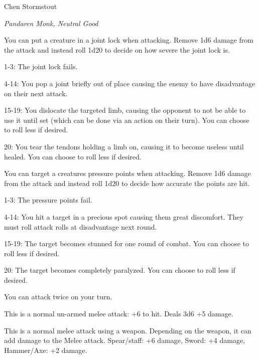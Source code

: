 \begin{monsterbox}{Chen Stormstout}
	\begin{hangingpar}
		\textit{Pandaren Monk, Neutral Good}
	\end{hangingpar}
	\dndline%
	\basics[%
	armorclass = 17,
	hitpoints  = 172,
	speed      = 40 ft
	]
	\dndline%
	\stats[
	STR = \stat{18}, %
	DEX = \stat{20},
	CON = \stat{16},
	INT = \stat{12},
	WIS = \stat{12},
	CHA = \stat{18}
	]
	\dndline%
	\details[%
	languages = {Common, Elvish, Dwarvish, Gnomish, Halfling, Orc, Pandaren},
	challenge = 10
	]
	\dndline%
	\begin{monsteraction}
		You can put a creature in a joint lock when attacking. Remove 1d6 damage from the attack and instead roll 1d20 to decide on how severe the joint lock is. 
		
		1-3: The joint lock fails. 
		
		4-14: You pop a joint briefly out of place causing the enemy to have disadvantage on their next attack.
		
		15-19: You dislocate the targeted limb, causing the opponent to not be able to use it until set (which can be done via an action on their turn). You can choose to roll less if desired.
		
		20: You tear the tendons holding a limb on, causing it to become useless until healed. You can choose to roll less if desired.
	\end{monsteraction}
	\begin{monsteraction}
		You can target a creatures pressure points when attacking. Remove 1d6 damage from the attack and instead roll 1d20 to decide how accurate the points are hit. 
		
		1-3: The pressure points fail. 
		
		4-14: You hit a target in a precious spot causing them great discomfort. They must roll attack rolls at disadvantage next round.
		
		15-19: The target becomes stunned for one round of combat. You can choose to roll less if desired.
		
		20: The target becomes completely paralyzed. You can choose to roll less if desired.
	\end{monsteraction}
	\begin{monsteraction}
		You can attack twice on your turn.
	\end{monsteraction}
	\begin{monsteraction}[Melee]
	This is a normal un-armed melee attack: +6 to hit. Deals 3d6 +5 damage.
	\end{monsteraction}
	\begin{monsteraction}
		This is a normal melee attack using a weapon. Depending on the weapon, it can add damage to the Melee attack. Spear/staff: +6 damage, Sword: +4 damage, Hammer/Axe: +2 damage.
	\end{monsteraction}


\end{monsterbox}
